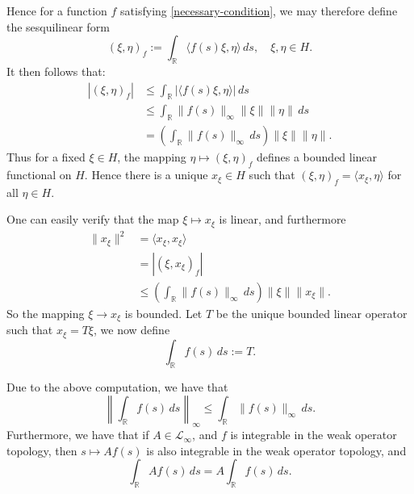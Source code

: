     Hence for a function $f$ satisfying \eqref{necessary-condition}, we may therefore define the sesquilinear form
    \begin{equation*}
        (\xi,\eta)_f := \int_{\mathbb{R}} \langle f(s)\xi,\eta\rangle\,ds,\quad \xi,\eta \in H.
    \end{equation*}
    It then follows that:
    \begin{align*}
        |(\xi,\eta)_f|  &\leq \int_{\mathbb{R}} |\langle f(s)\xi,\eta\rangle|\,ds\\
                        &\leq \int_{\mathbb{R}} \|f(s)\|_{\infty}\|\xi\|\|\eta\|\,ds\\
                        &= \left(\int_{\mathbb{R}} \|f(s)\|_{\infty}\,ds\right)\|\xi\|\|\eta\|.
    \end{align*}
    Thus for a fixed $\xi \in H$, the mapping $\eta \mapsto (\xi,\eta)_f$ defines a bounded linear functional on $H$. Hence
    there is a unique $x_\xi \in H$ such that $(\xi,\eta)_f = \langle x_\xi,\eta\rangle $ for all $\eta \in H$.
    
    One can easily verify that the map $\xi\mapsto x_\xi$ is linear, and furthermore
    \begin{align*}
        \|x_\xi\|^2 &= \langle x_\xi,x_\xi\rangle\\
                    &= |(\xi,x_\xi)_f|\\
                    &\leq \left(\int_{\mathbb{R}} \|f(s)\|_{\infty}\,ds\right)\|\xi\|\|x_\xi\|.
    \end{align*}
    So the mapping $\xi\to x_\xi$ is bounded. Let $T$ be the unique bounded linear operator such that $x_\xi = T\xi$, we now define
    \begin{equation}\label{wot integral definition}
        \int_{\mathbb{R}} f(s)\,ds := T.
    \end{equation}
    
    Due to the above computation, we have that
    \begin{equation*}
        \left\|\int_{\mathbb{R}} f(s)\,ds\right\|_\infty\leq \int_{\mathbb{R}} \|f(s)\|_{\infty}\,ds.
    \end{equation*}
    Furthermore, we have that if $A \in \mathcal{L}_{\infty}$, and $f$ is integrable in the weak operator topology, then 
    $s\mapsto Af(s)$ is also integrable in the weak operator topology, and
    \begin{equation*}
        \int_{\mathbb{R}} Af(s)\,ds = A\int_{\mathbb{R}} f(s)\,ds.
    \end{equation*}
    
